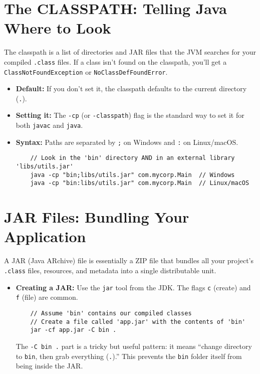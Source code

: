 \documentclass[12pt]{article}
\begin{document}
\begin{enumerate}[label=(\arabic*)]
\section{The CLASSPATH: Telling Java Where to Look}
The classpath is a list of directories and JAR files that the JVM searches for your compiled \texttt{.class} files. If a class isn't found on the classpath, you'll get a \texttt{ClassNotFoundException} or \texttt{NoClassDefFoundError}.
\begin{itemize}
    \item \textbf{Default:} If you don't set it, the classpath defaults to the current directory (\texttt{.}).
    \item \textbf{Setting it:} The \texttt{-cp} (or \texttt{-classpath}) flag is the standard way to set it for both \texttt{javac} and \texttt{java}.
    \item \textbf{Syntax:} Paths are separated by \texttt{;} on Windows and \texttt{:} on Linux/macOS.
    \begin{verbatim}
    // Look in the 'bin' directory AND in an external library 'libs/utils.jar'
    java -cp "bin;libs/utils.jar" com.mycorp.Main  // Windows
    java -cp "bin:libs/utils.jar" com.mycorp.Main  // Linux/macOS
    \end{verbatim}

\end{itemize}

\section{JAR Files: Bundling Your Application}
A JAR (Java ARchive) file is essentially a ZIP file that bundles all your project's \texttt{.class} files, resources, and metadata into a single distributable unit.
\begin{itemize}
    \item \textbf{Creating a JAR:} Use the \texttt{jar} tool from the JDK. The flags \texttt{c} (create) and \texttt{f} (file) are common.
    \begin{verbatim}
    // Assume 'bin' contains our compiled classes
    // Create a file called 'app.jar' with the contents of 'bin'
    jar -cf app.jar -C bin .
    \end{verbatim}
    The \texttt{-C bin .} part is a tricky but useful pattern: it means ``change directory to \texttt{bin}, then grab everything (\texttt{.}).'' This prevents the \texttt{bin} folder itself from being inside the JAR.


\end{itemize}
\end{enumerate}
\end{document}
